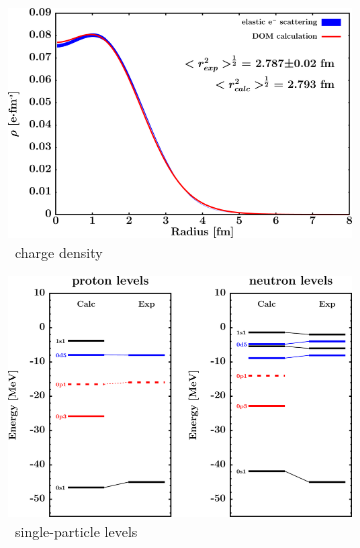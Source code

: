 \begin{figure}[hbtp]
    \captionsetup[subfigure]{labelformat=empty}
    \centering
    \begin{subfigure}[b]{0.45\textwidth}
        \centering
        \includegraphics[width=\linewidth]{figures/o18_chargeDensity.png}
        \caption{\oEight\ charge density}
        \label{DOMFitData_o18_chargeDensity}
    \end{subfigure}\hspace{6pt}
    \begin{subfigure}[b]{0.45\textwidth}
        \centering
        \includegraphics[width=\linewidth]{figures/o18_SPLevels.png}
        \caption{\oEight\ single-particle levels}
        \label{DOMFitData_o18_SPLevels}
    \end{subfigure}\vspace{0.3in}
    \begin{subfigure}[b]{0.45\textwidth}

\end{subfigure}
\end{figure}
